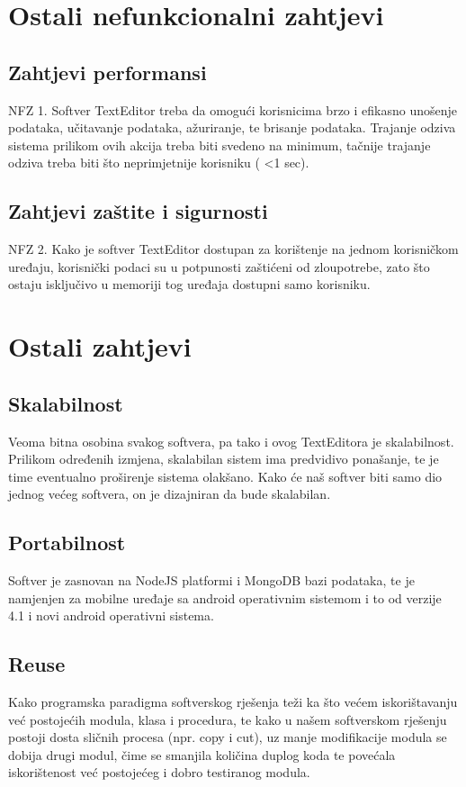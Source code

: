 \documentclass[utf8]{article}
\begin{document}
\section{Ostali nefunkcionalni zahtjevi}
\subsection{Zahtjevi performansi}
NFZ 1.  Softver TextEditor treba da omogući korisnicima brzo i efikasno unošenje podataka, učitavanje podataka, ažuriranje, te brisanje podataka. Trajanje odziva sistema prilikom ovih akcija treba biti svedeno na minimum, tačnije trajanje odziva treba biti što neprimjetnije korisniku ( <1 sec).
\subsection{Zahtjevi zaštite i sigurnosti}
NFZ 2.  Kako je softver TextEditor dostupan za korištenje na jednom korisničkom uređaju, korisnički podaci su u potpunosti zaštićeni od zloupotrebe, zato što ostaju isključivo u memoriji tog uređaja dostupni samo korisniku.
\section{Ostali zahtjevi}
\subsection{Skalabilnost}
Veoma bitna osobina svakog softvera, pa tako i ovog TextEditora je skalabilnost. Prilikom određenih izmjena, skalabilan sistem ima predvidivo ponašanje, te je time eventualno proširenje sistema olakšano. Kako će naš softver biti samo dio jednog većeg softvera, on je dizajniran da bude skalabilan.
\subsection{Portabilnost}
Softver je zasnovan na NodeJS platformi i MongoDB bazi podataka, te je namjenjen za mobilne uređaje sa android operativnim sistemom i to od verzije 4.1 i novi android operativni sistema.
\subsection{Reuse}
Kako programska paradigma softverskog rješenja teži ka što većem iskorištavanju već postojećih modula, klasa i procedura, te kako u našem softverskom rješenju postoji dosta sličnih procesa (npr. copy i cut), uz manje modifikacije modula se dobija drugi modul, čime se smanjila količina duplog koda te povećala iskorištenost već postojećeg i dobro testiranog modula.
\end{document}
